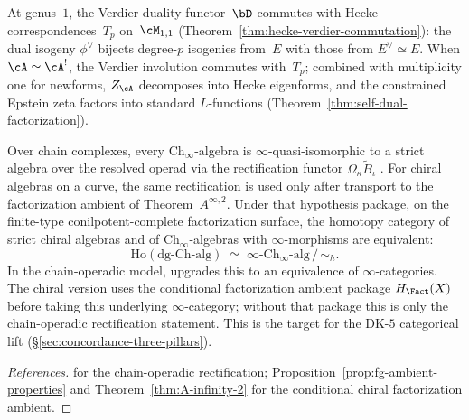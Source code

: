 \begin{remark}%
\label{rem:verdier-hecke-equivariance}%
%
At genus~$1$, the Verdier duality functor~$\bD$ commutes
with Hecke correspondences~$T_p$ on~$\cM_{1,1}$
(Theorem~\ref{thm:hecke-verdier-commutation}):
the dual isogeny $\phi^\vee$ bijects degree-$p$ isogenies
from~$E$ with those from $E^\vee\simeq E$.
When $\cA\simeq\cA^!$, the Verdier involution commutes
with~$T_p$; combined with multiplicity one for newforms,
$Z_\cA$ decomposes into Hecke eigenforms, and the
constrained Epstein zeta factors into standard
$L$-functions
(Theorem~\ref{thm:self-dual-factorization}).
\end{remark}

\begin{corollary}
\label{cor:rectification-ch-infty}
Over chain complexes, every $\mathrm{Ch}_\infty$-algebra is
$\infty$-quasi-isomorphic to a strict algebra over the resolved
operad via the rectification functor
$\Omega_\kappa \tilde{B}_\iota$
\textup{\cite[Theorem~1.2]{Val16}}. For chiral algebras on a curve,
the same rectification is used only after transport to the
factorization ambient of Theorem~$A^{\infty,2}$. Under that hypothesis
package, on the
finite-type conilpotent-complete factorization surface, the homotopy
category of strict chiral algebras and of $\mathrm{Ch}_\infty$-algebras
with $\infty$-morphisms are equivalent:
\[
\mathrm{Ho}(\mathrm{dg}\text{-}\mathrm{Ch\text{-}alg})
\;\simeq\;
\infty\text{-}\mathrm{Ch}_\infty\text{-}\mathrm{alg}\, /\,{\sim_h}.
\]
In the chain-operadic model,
\textup{\cite[Theorem~3.8]{Val16}} upgrades this to an equivalence of
$\infty$-categories. The chiral version uses the conditional
factorization ambient package $H_{\Fact}(X)$ before taking this
underlying $\infty$-category; without that package this is only the
chain-operadic rectification statement. This is the target for the DK-$5$
categorical lift
\textup{(}\S\textup{\ref{sec:concordance-three-pillars})}.
\end{corollary}

\begin{proof}[References]
\cite[Theorems~1.2, 3.7, and 3.8]{Val16} for the chain-operadic
rectification; Proposition~\ref{prop:fg-ambient-properties} and
Theorem~\ref{thm:A-infinity-2} for the conditional chiral
factorization ambient.
\end{proof}

